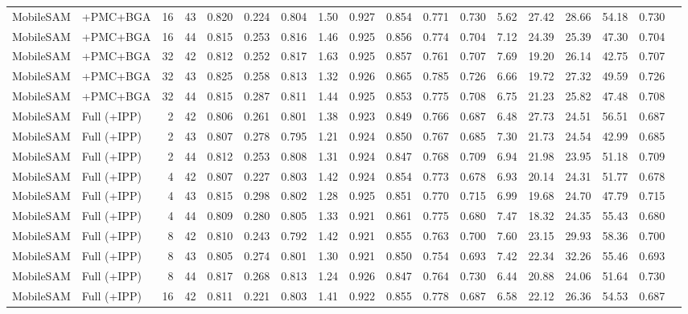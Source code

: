 \documentclass[10pt]{article}
\begin{document}
\begin{landscape}
{\begin{longtable}{l l r r r r r r r r r r r r r r r l}
MobileSAM & +PMC+BGA & 16 & 43 & 0.820 & 0.224 & 0.804 & 1.50 & 0.927 & 0.854 & 0.771 & 0.730 & 5.62 & 27.42 & 28.66 & 54.18 & 0.730 &  \\
MobileSAM & +PMC+BGA & 16 & 44 & 0.815 & 0.253 & 0.816 & 1.46 & 0.925 & 0.856 & 0.774 & 0.704 & 7.12 & 24.39 & 25.39 & 47.30 & 0.704 &  \\
MobileSAM & +PMC+BGA & 32 & 42 & 0.812 & 0.252 & 0.817 & 1.63 & 0.925 & 0.857 & 0.761 & 0.707 & 7.69 & 19.20 & 26.14 & 42.75 & 0.707 &  \\
MobileSAM & +PMC+BGA & 32 & 43 & 0.825 & 0.258 & 0.813 & 1.32 & 0.926 & 0.865 & 0.785 & 0.726 & 6.66 & 19.72 & 27.32 & 49.59 & 0.726 &  \\
MobileSAM & +PMC+BGA & 32 & 44 & 0.815 & 0.287 & 0.811 & 1.44 & 0.925 & 0.853 & 0.775 & 0.708 & 6.75 & 21.23 & 25.82 & 47.48 & 0.708 &  \\
MobileSAM & Full (+IPP) & 2 & 42 & 0.806 & 0.261 & 0.801 & 1.38 & 0.923 & 0.849 & 0.766 & 0.687 & 6.48 & 27.73 & 24.51 & 56.51 & 0.687 &  \\
MobileSAM & Full (+IPP) & 2 & 43 & 0.807 & 0.278 & 0.795 & 1.21 & 0.924 & 0.850 & 0.767 & 0.685 & 7.30 & 21.73 & 24.54 & 42.99 & 0.685 &  \\
MobileSAM & Full (+IPP) & 2 & 44 & 0.812 & 0.253 & 0.808 & 1.31 & 0.924 & 0.847 & 0.768 & 0.709 & 6.94 & 21.98 & 23.95 & 51.18 & 0.709 &  \\
MobileSAM & Full (+IPP) & 4 & 42 & 0.807 & 0.227 & 0.803 & 1.42 & 0.924 & 0.854 & 0.773 & 0.678 & 6.93 & 20.14 & 24.31 & 51.77 & 0.678 &  \\
MobileSAM & Full (+IPP) & 4 & 43 & 0.815 & 0.298 & 0.802 & 1.28 & 0.925 & 0.851 & 0.770 & 0.715 & 6.99 & 19.68 & 24.70 & 47.79 & 0.715 &  \\
MobileSAM & Full (+IPP) & 4 & 44 & 0.809 & 0.280 & 0.805 & 1.33 & 0.921 & 0.861 & 0.775 & 0.680 & 7.47 & 18.32 & 24.35 & 55.43 & 0.680 &  \\
MobileSAM & Full (+IPP) & 8 & 42 & 0.810 & 0.243 & 0.792 & 1.42 & 0.921 & 0.855 & 0.763 & 0.700 & 7.60 & 23.15 & 29.93 & 58.36 & 0.700 &  \\
MobileSAM & Full (+IPP) & 8 & 43 & 0.805 & 0.274 & 0.801 & 1.30 & 0.921 & 0.850 & 0.754 & 0.693 & 7.42 & 22.34 & 32.26 & 55.46 & 0.693 &  \\
MobileSAM & Full (+IPP) & 8 & 44 & 0.817 & 0.268 & 0.813 & 1.24 & 0.926 & 0.847 & 0.764 & 0.730 & 6.44 & 20.88 & 24.06 & 51.64 & 0.730 &  \\
MobileSAM & Full (+IPP) & 16 & 42 & 0.811 & 0.221 & 0.803 & 1.41 & 0.922 & 0.855 & 0.778 & 0.687 & 6.58 & 22.12 & 26.36 & 54.53 & 0.687 &  \\

\end{longtable}}
\end{landscape}
\end{document}
